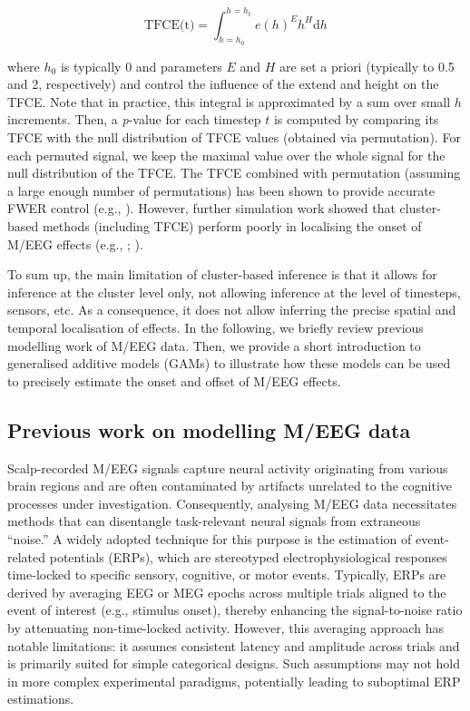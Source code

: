 \documentclass[
  doc,
  floatsintext,
  longtable,
  a4paper,
  nolmodern,
  notxfonts,
  notimes,
  donotrepeattitle,
  colorlinks=true,linkcolor=blue,citecolor=blue,urlcolor=blue]{apa7}
\begin{document}
\[
\text{TFCE(t)} = \int_{h=h_{0}}^{h=h_{t}} e(h)^{E} h^{H} \mathrm{d}h
\]

where \(h_{0}\) is typically \(0\) and parameters \(E\) and \(H\) are
set a priori (typically to 0.5 and 2, respectively) and control the
influence of the extend and height on the TFCE. Note that in practice,
this integral is approximated by a sum over small \(h\) increments.
Then, a \emph{p}-value for each timestep \(t\) is computed by comparing
its TFCE with the null distribution of TFCE values (obtained via
permutation). For each permuted signal, we keep the maximal value over
the whole signal for the null distribution of the TFCE. The TFCE
combined with permutation (assuming a large enough number of
permutations) has been shown to provide accurate FWER control (e.g.,
). However, further
simulation work showed that cluster-based methods (including TFCE)
perform poorly in localising the onset of M/EEG effects (e.g.,
;
).

To sum up, the main limitation of cluster-based inference is that it
allows for inference at the cluster level only, not allowing inference
at the level of timesteps, sensors, etc. As a consequence, it does not
allow inferring the precise spatial and temporal localisation of
effects. In the following, we briefly review previous modelling work of
M/EEG data. Then, we provide a short introduction to generalised
additive models (GAMs) to illustrate how these models can be used to
precisely estimate the onset and offset of M/EEG effects.

\subsection{Previous work on modelling M/EEG
data}\label{previous-work-on-modelling-meeg-data}

Scalp-recorded M/EEG signals capture neural activity originating from
various brain regions and are often contaminated by artifacts unrelated
to the cognitive processes under investigation. Consequently, analysing
M/EEG data necessitates methods that can disentangle task-relevant
neural signals from extraneous ``noise.'' A widely adopted technique for
this purpose is the estimation of event-related potentials (ERPs), which
are stereotyped electrophysiological responses time-locked to specific
sensory, cognitive, or motor events. Typically, ERPs are derived by
averaging EEG or MEG epochs across multiple trials aligned to the event
of interest (e.g., stimulus onset), thereby enhancing the
signal-to-noise ratio by attenuating non-time-locked activity. However,
this averaging approach has notable limitations: it assumes consistent
latency and amplitude across trials and is primarily suited for simple
categorical designs. Such assumptions may not hold in more complex
experimental paradigms, potentially leading to suboptimal ERP
estimations.
\end{document}
